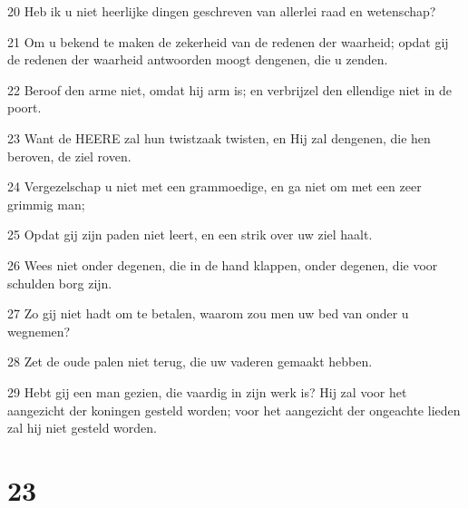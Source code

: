 \par 20 Heb ik u niet heerlijke dingen geschreven van allerlei raad en wetenschap?
\par 21 Om u bekend te maken de zekerheid van de redenen der waarheid; opdat gij de redenen der waarheid antwoorden moogt dengenen, die u zenden.
\par 22 Beroof den arme niet, omdat hij arm is; en verbrijzel den ellendige niet in de poort.
\par 23 Want de HEERE zal hun twistzaak twisten, en Hij zal dengenen, die hen beroven, de ziel roven.
\par 24 Vergezelschap u niet met een grammoedige, en ga niet om met een zeer grimmig man;
\par 25 Opdat gij zijn paden niet leert, en een strik over uw ziel haalt.
\par 26 Wees niet onder degenen, die in de hand klappen, onder degenen, die voor schulden borg zijn.
\par 27 Zo gij niet hadt om te betalen, waarom zou men uw bed van onder u wegnemen?
\par 28 Zet de oude palen niet terug, die uw vaderen gemaakt hebben.
\par 29 Hebt gij een man gezien, die vaardig in zijn werk is? Hij zal voor het aangezicht der koningen gesteld worden; voor het aangezicht der ongeachte lieden zal hij niet gesteld worden.

\chapter{23}

